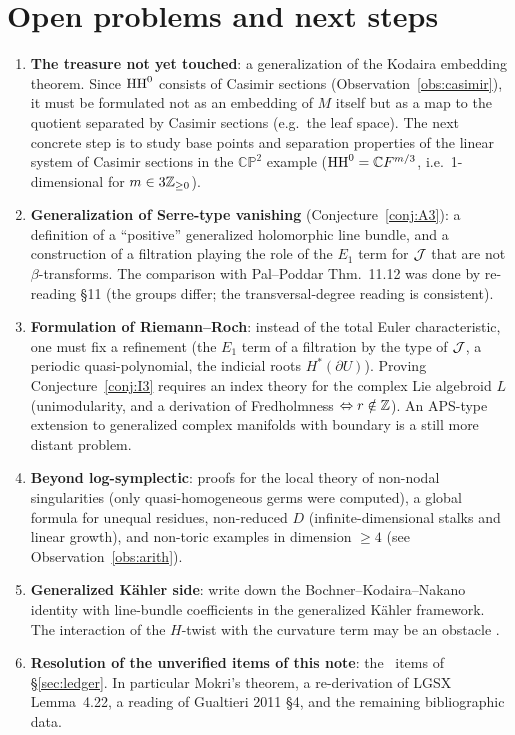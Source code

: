 \section{Open problems and next steps}\label{sec:open}
\begin{enumerate}
\item \textbf{The treasure not yet touched}: a generalization of the Kodaira embedding theorem. Since $\mathrm{HH}^0$ consists of Casimir sections (Observation~\ref{obs:casimir}), it must be formulated not as an embedding of $M$ itself but as a map to the quotient separated by Casimir sections (e.g.\ the leaf space). The next concrete step is to study base points and separation properties of the linear system of Casimir sections in the $\mathbb{CP}^2$ example ($\mathrm{HH}^0=\mathbb C F^{m/3}$, i.e.\ 1-dimensional for $m\in3\mathbb Z_{\ge0}$).
\item \textbf{Generalization of Serre-type vanishing} (Conjecture~\ref{conj:A3}): a definition of a ``positive'' generalized holomorphic line bundle, and a construction of a filtration playing the role of the $E_1$ term for $\mathcal J$ that are not $\beta$-transforms. The comparison with Pal--Poddar Thm.~11.12 was done by re-reading \S11 (the groups differ; the transversal-degree reading is consistent).
\item \textbf{Formulation of Riemann--Roch}: instead of the total Euler characteristic, one must fix a refinement (the $E_1$ term of a filtration by the type of $\mathcal J$, a periodic quasi-polynomial, the indicial roots $H^*(\partial U)$). Proving Conjecture~\ref{conj:I3} requires an index theory for the complex Lie algebroid $L$ (unimodularity, and a derivation of Fredholmness $\Leftrightarrow r\notin\mathbb Z$). An APS-type extension to generalized complex manifolds with boundary is a still more distant problem.
\item \textbf{Beyond log-symplectic}: proofs for the local theory of non-nodal singularities (only quasi-homogeneous germs were computed), a global formula for unequal residues, non-reduced $D$ (infinite-dimensional stalks and linear growth), and non-toric examples in dimension $\ge4$ (see Observation~\ref{obs:arith}).
\item \textbf{Generalized K\"ahler side}: write down the Bochner--Kodaira--Nakano identity with line-bundle coefficients in the generalized K\"ahler framework. The interaction of the $H$-twist with the curvature term may be an obstacle \tK.
\item \textbf{Resolution of the unverified items of this note}: the \tQ\ items of \S\ref{sec:ledger}. In particular Mokri's theorem, a re-derivation of LGSX Lemma~4.22, a reading of Gualtieri 2011 \S4, and the remaining bibliographic data.
\end{enumerate}


